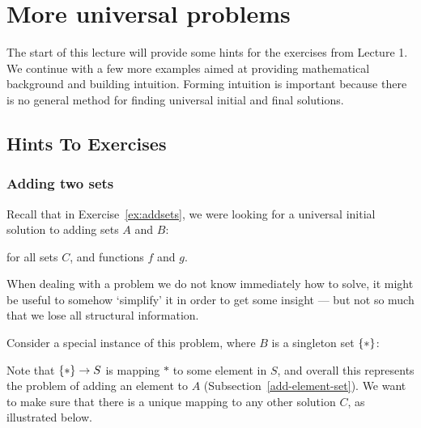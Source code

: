 \chapter{More universal problems}

The start of this lecture will provide some hints for the exercises from
Lecture 1.  We continue with a few more examples aimed at providing
mathematical background and building intuition.  Forming intuition is
important because there is no general method for finding universal initial and
final solutions.

\section{Hints To Exercises}

\subsection{Adding two sets}

Recall that in Exercise~\ref{ex:addsets}, we were looking for a universal
initial solution to adding sets $A$ and $B$:
\begin{center}
\end{center}
for all sets $C$, and functions $f$ and $g$.

When dealing with a problem we do not know immediately how to solve, it might be
useful to somehow `simplify' it in order to get some insight --- but not so much
that we lose all structural information.

Consider a special instance of this problem, where $B$ is a singleton set
$\{ \ast \}$:

\begin{center}
\end{center}

Note that $\{ \ast \} \to S$ is mapping $\ast$ to some element in $S$, and
overall this represents the problem of adding an element to $A$
(Subsection~\ref{add-element-set}). We want to make sure that there is a unique
mapping to any other solution $C$, as illustrated below.

